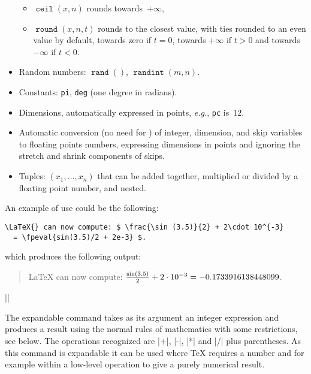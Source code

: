 \documentclass{ltxguide}
\providecommand\fpop[1]{\mathop{\texttt{#1}}}
\begin{document}
\begin{itemize}
\begin{itemize}
    \item $\fpop{ceil}(x,n)$ rounds towards~$+\infty$,
    \item $\fpop{round}(x,n,t)$ rounds to the closest value, with
    ties rounded to an even value by default, towards zero if $t=0$,
    towards $+\infty$ if $t>0$ and towards $-\infty$ if $t<0$.
    \end{itemize}
  \item Random numbers: $\fpop{rand}()$, $\fpop{randint}(m,n)$.
  \item Constants: \texttt{pi}, \texttt{deg} (one degree in radians).
  \item Dimensions, automatically expressed in points, \emph{e.g.},
    \texttt{pc} is~$12$.
  \item Automatic conversion (no need for ) of
    integer, dimension, and skip variables to floating points numbers,
    expressing dimensions in points and ignoring the stretch and
    shrink components of skips.
  \item Tuples: $(x_1,\ldots{},x_n)$ that can be added together,
    multiplied or divided by a floating point number, and nested.
\end{itemize}

An example of use could be the following:
\begin{verbatim}
\LaTeX{} can now compute: $ \frac{\sin (3.5)}{2} + 2\cdot 10^{-3}
  = \fpeval{sin(3.5)/2 + 2e-3} $.
\end{verbatim}
which produces the following output:
\begin{quote}
  \LaTeX{} can now compute: $ \frac{\sin (3.5)}{2} + 2\cdot 10^{-3}
  = \fpeval{sin(3.5)/2 + 2e-3} $.
\end{quote}

\begin{decl}
  |\inteval| 
\end{decl}

  The expandable command  takes as its argument an integer
  expression and produces a result using the normal rules of
  mathematics with some restrictions, see below. The operations
  recognized are |+|, |-|, |*| and |/| plus parentheses.  As this
  command is expandable it can be used where \TeX{} requires a number
  and for example within a low-level  operation to give a
  purely numerical result.
\end{document}
